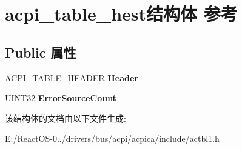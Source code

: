 \hypertarget{structacpi__table__hest}{}\section{acpi\+\_\+table\+\_\+hest结构体 参考}
\label{structacpi__table__hest}
\subsection*{Public 属性}
\begin{DoxyCompactItemize}
\item 
\mbox{\label{structacpi__table__hest_a0da13c61e855536edd62dd38a5c31c9a}} 
\hyperlink{structacpi__table__header}{A\+C\+P\+I\+\_\+\+T\+A\+B\+L\+E\+\_\+\+H\+E\+A\+D\+ER} {\bfseries Header}
\item 
\mbox{\label{structacpi__table__hest_a951fb113e79b19d7e59bda07a30783d2}} 
\hyperlink{_processor_bind_8h_ae1e6edbbc26d6fbc71a90190d0266018}{U\+I\+N\+T32} {\bfseries Error\+Source\+Count}
\end{DoxyCompactItemize}


该结构体的文档由以下文件生成\+:\begin{DoxyCompactItemize}
\item 
E\+:/\+React\+O\+S-\/0../drivers/bus/acpi/acpica/include/actbl1.\+h\end{DoxyCompactItemize}
